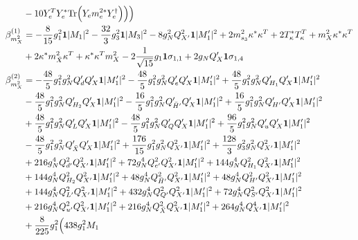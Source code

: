 {\begin{align}
 &-10 {Y_{e}^{T}  Y_e^*} \mbox{Tr}\Big({Y_e  m_e^{2 *}  Y_{e}^{\dagger}}\Big) \Big)\Big)\\ 
\beta_{m_{X}^2}^{(1)} & =  
-\frac{8}{15} g_{1}^{2} {\bf 1} |M_1|^2 -\frac{32}{3} g_{3}^{2} {\bf 1} |M_3|^2 -8 g_{N}^{2} Q_{X'}^{2} {\bf 1} |M_1'|^2 +2 m_{s_3}^2 {\kappa^*  \kappa^{T}} +2 {T_{\kappa}^*  T_{\kappa}^{T}} +{m_{X}^2  \kappa^*  \kappa^{T}}\nonumber \\ 
 &+2 {\kappa^*  m_{\bar{X}}^2  \kappa^{T}} +{\kappa^*  \kappa^{T}  m_{X}^2}-2 \frac{1}{\sqrt{15}} g_1 {\bf 1} \sigma_{1,1} +2 g_N Q_X' {\bf 1} \sigma_{1,4} \\ 
\beta_{m_{X}^2}^{(2)} & =  
-\frac{48}{5} g_{1}^{2} g_{N}^{2} Q_d' Q_X' {\bf 1} |M_1'|^2 -\frac{48}{5} g_{1}^{2} g_{N}^{2} Q_e' Q_X' {\bf 1} |M_1'|^2 +\frac{48}{5} g_{1}^{2} g_{N}^{2} Q_{H_1}' Q_X' {\bf 1} |M_1'|^2 \nonumber \\ 
 &-\frac{48}{5} g_{1}^{2} g_{N}^{2} Q_{H_2}' Q_X' {\bf 1} |M_1'|^2 -\frac{16}{5} g_{1}^{2} g_{N}^{2} Q_{\bar{H}'}' Q_X' {\bf 1} |M_1'|^2 +\frac{16}{5} g_{1}^{2} g_{N}^{2} Q_{H'}' Q_X' {\bf 1} |M_1'|^2 \nonumber \\ 
 &+\frac{48}{5} g_{1}^{2} g_{N}^{2} Q_L' Q_X' {\bf 1} |M_1'|^2 -\frac{48}{5} g_{1}^{2} g_{N}^{2} Q_Q' Q_X' {\bf 1} |M_1'|^2 +\frac{96}{5} g_{1}^{2} g_{N}^{2} Q_u' Q_X' {\bf 1} |M_1'|^2 \nonumber \\ 
 &-\frac{48}{5} g_{1}^{2} g_{N}^{2} Q_{\bar{X}}' Q_X' {\bf 1} |M_1'|^2 +\frac{176}{15} g_{1}^{2} g_{N}^{2} Q_{X'}^{2} {\bf 1} |M_1'|^2 +\frac{128}{3} g_{3}^{2} g_{N}^{2} Q_{X'}^{2} {\bf 1} |M_1'|^2 \nonumber \\ 
 &+216 g_{N}^{4} Q_{d'}^{2} Q_{X'}^{2} {\bf 1} |M_1'|^2 +72 g_{N}^{4} Q_{e'}^{2} Q_{X'}^{2} {\bf 1} |M_1'|^2 +144 g_{N}^{4} Q_{H_1}^{2} Q_{X'}^{2} {\bf 1} |M_1'|^2 \nonumber \\ 
 &+144 g_{N}^{4} Q_{H_2}^{2} Q_{X'}^{2} {\bf 1} |M_1'|^2 +48 g_{N}^{4} Q_{\bar{H}'}^{2} Q_{X'}^{2} {\bf 1} |M_1'|^2 +48 g_{N}^{4} Q_{H'}^{2} Q_{X'}^{2} {\bf 1} |M_1'|^2 \nonumber \\ 
 &+144 g_{N}^{4} Q_{L'}^{2} Q_{X'}^{2} {\bf 1} |M_1'|^2 +432 g_{N}^{4} Q_{Q'}^{2} Q_{X'}^{2} {\bf 1} |M_1'|^2 +72 g_{N}^{4} Q_{S'}^{2} Q_{X'}^{2} {\bf 1} |M_1'|^2 \nonumber \\ 
 &+216 g_{N}^{4} Q_{u'}^{2} Q_{X'}^{2} {\bf 1} |M_1'|^2 +216 g_{N}^{4} Q_{\bar{X}}^{2} Q_{X'}^{2} {\bf 1} |M_1'|^2 +264 g_{N}^{4} Q_{X'}^{4} {\bf 1} |M_1'|^2 \nonumber \\ 
 &+\frac{8}{225} g_{1}^{2} \Big(438 g_{1}^{2} M_1 \nonumber \\ 

\end{align}}
